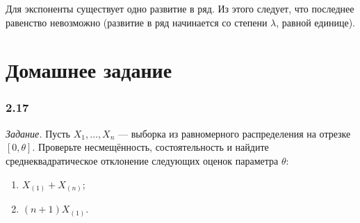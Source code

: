 Для экспоненты существует одно развитие в ряд.
Из этого следует, что последнее равенство невозможно
(развитие в ряд начинается со степени $ \lambda $, равной единице).

\section*{Домашнее задание}

\subsubsection*{2.17}

\textit{Задание.}
Пусть $X_1, \dotsc, X_n$ ---
выборка из равномерного распределения на отрезке $ \left[ 0, \theta \right] $.
Проверьте несмещённость,
состоятельность и найдите среднеквадратическое отклонение следующих оценок параметра $ \theta $:
\begin{enumerate}[label=\alph*)]
  \item $X_{ \left( 1 \right) } + X_{ \left( n \right) }$;
  \item $ \left( n + 1 \right) X_{ \left( 1 \right) }$.
\end{enumerate}

